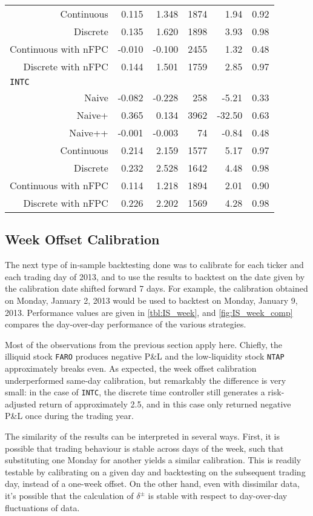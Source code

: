 \begin{table}
\begin{tabular}{@{} *{6}{r} @{}}
Continuous & 0.115 & 1.348 & 1874 & 1.94 & 0.92 \\ 
Discrete & 0.135 & 1.620 & 1898 & 3.93 & 0.98 \\ 
Continuous with nFPC & -0.010 & -0.100 & 2455 & 1.32 & 0.48 \\ 
Discrete with nFPC & 0.144 & 1.501 & 1759 & 2.85 & 0.97 \\[2ex]
\multicolumn{6}{l}{\texttt{INTC}} \\
Naive & -0.082 & -0.228 & 258 & -5.21 & 0.33 \\ 
Naive+ & 0.365 & 0.134 & 3962 & -32.50 & 0.63 \\ 
Naive++ & -0.001 & -0.003 & 74 & -0.84 & 0.48 \\ 
Continuous & 0.214 & 2.159 & 1577 & 5.17 & 0.97 \\ 
Discrete & 0.232 & 2.528 & 1642 & 4.48 & 0.98 \\ 
Continuous with nFPC & 0.114 & 1.218 & 1894 & 2.01 & 0.90 \\ 
Discrete with nFPC &  0.226 & 2.202 & 1569 & 4.28 & 0.98 \\ 
\bottomrule
\end{tabular}
\end{table}

\FloatBarrier
\subsection{Week Offset Calibration}
The next type of in-sample backtesting done was to calibrate for each ticker and each trading day of 2013, and to use the results to backtest on the date given by the calibration date shifted forward 7 days. For example, the calibration obtained on Monday, January 2, 2013 would be used to backtest on Monday, January 9, 2013. Performance values are given in \autoref{tbl:IS_week}, and \autoref{fig:IS_week_comp} compares the day-over-day performance of the various strategies. 

Most of the observations from the previous section apply here. Chiefly, the illiquid stock \texttt{FARO} produces negative P\&L and the low-liquidity stock \texttt{NTAP} approximately breaks even. As expected, the week offset calibration underperformed same-day calibration, but remarkably the difference is very small: in the case of \texttt{INTC}, the discrete time controller still generates a risk-adjusted return of approximately 2.5, and in this case only returned negative P\&L once during the trading year. 

The similarity of the results can be interpreted in several ways. First, it is possible that trading behaviour is stable across days of the week, such that substituting one Monday for another yields a similar calibration. This is readily testable by calibrating on a given day and backtesting on the subsequent trading day, instead of a one-week offset. On the other hand, even with dissimilar data, it's possible that the calculation of $\delta^\pm$ is stable with respect to day-over-day fluctuations of data.

